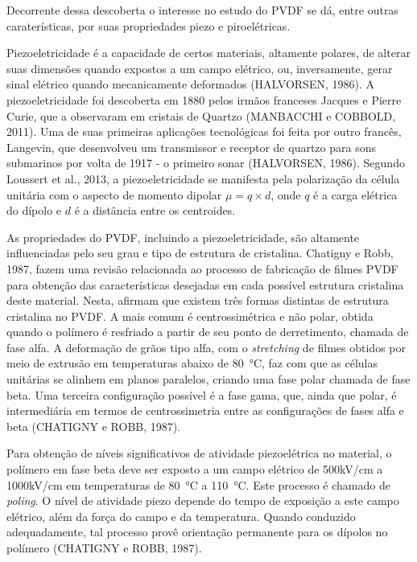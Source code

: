 \documentclass[
	12pt,				
	oneside,			
	a4paper,			
	english,			
	brazil,			
	]{abntex2ppgsi}
\begin{document}
Decorrente dessa descoberta o interesse no estudo do PVDF se dá, entre outras caraterísticas, por suas propriedades piezo e piroelétricas. 

Piezoeletricidade é a capacidade de certos materiais, altamente polares, de alterar suas dimensões quando expostos a um campo elétrico, ou, inversamente, gerar sinal elétrico quando mecanicamente deformados (HALVORSEN, 1986). A piezoeletricidade foi descoberta em 1880 pelos irmãos franceses Jacques e Pierre Curie, que a observaram em cristais de Quartzo (MANBACCHI e COBBOLD, 2011). Uma de suas primeiras aplicações tecnológicas foi feita por outro francês, Langevin, que desenvolveu um transmissor e receptor de quartzo para sons submarinos por volta de 1917 - o primeiro sonar (HALVORSEN, 1986). Segundo Loussert et al., 2013, a piezoeletricidade se manifesta pela polarização da célula unitária com o aspecto de momento dipolar $\mu = q\times d$, onde $q$ é a carga elétrica do dípolo e $d$ é a distância entre os centroides.  

As propriedades do PVDF, incluindo a piezoeletricidade, são altamente influenciadas pelo seu grau e tipo de estrutura de cristalina. Chatigny e Robb, 1987, fazem uma revisão relacionada ao processo de fabricação de filmes PVDF para obtenção das características desejadas em cada possível estrutura cristalina deste material. Nesta, afirmam que existem três formas distintas de estrutura cristalina no PVDF. A mais comum é centrossimétrica e não polar, obtida quando o polímero é resfriado a partir de seu ponto de derretimento, chamada de fase alfa. A deformação de grãos tipo alfa, com o \textit{stretching} de filmes obtidos por meio de extrusão em temperaturas abaixo de \SI{80}{\celsius}, faz com que as células unitárias se alinhem em planos paralelos, criando uma fase polar chamada de fase beta. Uma terceira configuração possível é a fase gama, que, ainda que polar, é intermediária em termos de centrossimetria entre as configurações de fases alfa e beta (CHATIGNY e ROBB, 1987).

Para obtenção de níveis significativos de atividade piezoelétrica no material, o polímero em fase beta deve ser exposto a um campo elétrico de 500kV/cm a 1000kV/cm em temperaturas de \SI{80}{\celsius} a \SI{110}{\celsius}. Este processo é chamado de \textit{poling}. O nível de atividade piezo depende do tempo de exposição a este campo elétrico, além da força do campo e da temperatura. Quando conduzido adequadamente, tal processo provê orientação permanente para os dípolos no polímero (CHATIGNY e ROBB, 1987). 
\end{document}
